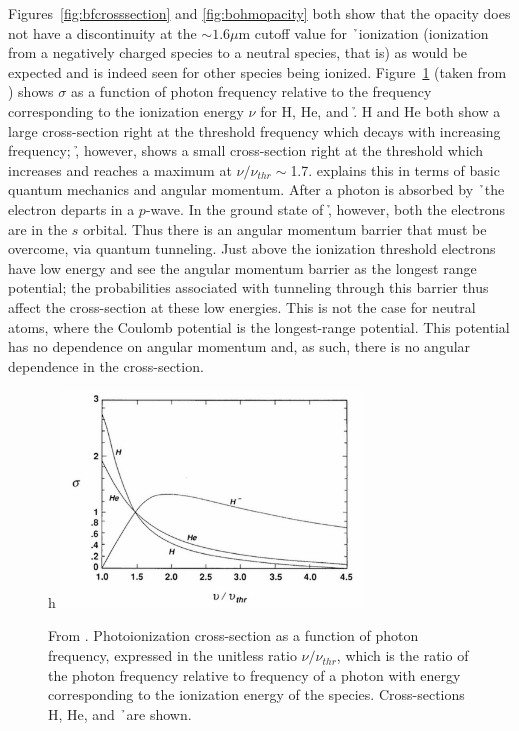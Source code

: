 Figures~\ref{fig:bfcrosssection} and \ref{fig:bohmopacity} both show
that the opacity does not have a discontinuity at the $\sim 1.6\mu$m
cutoff value for \h\ ionization (ionization from a negatively
charged species to a neutral species, that is) as would be expected and is indeed
seen for other species being ionized.  Figure~\ref{fig:bethe} (taken
from \citealt{bethe1977}) shows $\sigma$ as a function of photon
frequency relative to the frequency corresponding to the ionization
energy $\nu$ for H, He, and \h.  H and He both show a large
cross-section right at the threshold frequency which decays with
increasing frequency; \h, however, shows a small cross-section right
at the threshold which increases and reaches a maximum at
$\nu/\nu_{thr}\sim$1.7.  \cite{rau1996} explains this in terms of basic
quantum mechanics and angular momentum.  After a photon is absorbed by
\h\ the electron departs in a $p$-wave.  In the ground state of \h,
however, both the electrons are in the $s$ orbital.  Thus there is an
angular momentum barrier that must be overcome, via quantum
tunneling.  Just above the ionization threshold electrons have low
energy and see the angular momentum barrier as the longest range
potential; the probabilities associated with tunneling through this
barrier thus affect the cross-section at these low energies.  This is not the case for neutral atoms, where the Coulomb
potential is the longest-range potential.  This potential has no dependence on angular momentum and, as such, there is no angular dependence in the cross-section.
\begin{figure}{h}
\includegraphics[width=80mm]{figs/betheplot.png}
\caption{\label{fig:bethe} From \citealt{bethe1977}. Photoionization
  cross-section as a function of photon frequency, expressed in the
  unitless ratio $\nu/\nu_{thr}$, which is the ratio of the photon
  frequency relative to frequency of a photon with energy
  corresponding to the ionization energy of the species.
  Cross-sections H, He, and \h\ are shown.}
\end{figure}

